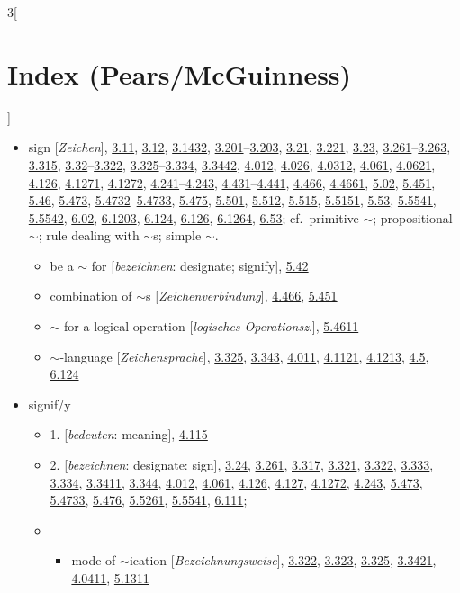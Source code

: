 \documentclass[oneside,openany,12pt]{book}
\newcommand{\indexentry}[1]{\item #1}
\newcommand{\indexsubentry}[1]{\begin{itemize} \item #1 \end{itemize}}
\newcommand{\indexsubsubentry}[1]{\begin{itemize} \item \begin{itemize} \item #1 \end{itemize} \end{itemize}}
\newcommand{\indexref}[1]{\hyperlink{prop#1}{#1}}
\begin{document}
\begin{multicols}{3}[\section*{Index (Pears/McGuinness)}]
\begin{itemize}
\indexentry{sign [\textit{Zeichen}], \indexref{3.11}, \indexref{3.12}, \indexref{3.1432}, \indexref{3.201}--\indexref{3.203}, \indexref{3.21}, \indexref{3.221}, \indexref{3.23}, \indexref{3.261}--\indexref{3.263}, \indexref{3.315}, \indexref{3.32}--\indexref{3.322}, \indexref{3.325}--\indexref{3.334}, \indexref{3.3442}, \indexref{4.012}, \indexref{4.026}, \indexref{4.0312}, \indexref{4.061}, \indexref{4.0621}, \indexref{4.126}, \indexref{4.1271}, \indexref{4.1272}, \indexref{4.241}--\indexref{4.243}, \indexref{4.431}--\indexref{4.441}, \indexref{4.466}, \indexref{4.4661}, \indexref{5.02}, \indexref{5.451}, \indexref{5.46}, \indexref{5.473}, \indexref{5.4732}--\indexref{5.4733}, \indexref{5.475}, \indexref{5.501}, \indexref{5.512}, \indexref{5.515}, \indexref{5.5151}, \indexref{5.53}, \indexref{5.5541}, \indexref{5.5542}, \indexref{6.02}, \indexref{6.1203}, \indexref{6.124}, \indexref{6.126}, \indexref{6.1264}, \indexref{6.53}; cf.\ primitive $\sim$; propositional $\sim$; rule dealing with $\sim$s; simple $\sim$.}

   \indexsubentry{be a $\sim$ for [\textit{bezeichnen}: designate; signify], \indexref{5.42}}

   \indexsubentry{combination of $\sim$s [\textit{Zeichenverbindung}], \indexref{4.466}, \indexref{5.451}}

   \indexsubentry{$\sim$ for a logical operation [\textit{logisches Operationsz}.], \indexref{5.4611}}

   \indexsubentry{$\sim$-language [\textit{Zeichensprache}], \indexref{3.325}, \indexref{3.343}, \indexref{4.011}, \indexref{4.1121}, \indexref{4.1213}, \indexref{4.5}, \indexref{6.124}}

\indexentry{signif/y}

   \indexsubentry{1. [\textit{bedeuten}: meaning], \indexref{4.115}}

   \indexsubentry{2. [\textit{bezeichnen}: designate: sign], \indexref{3.24}, \indexref{3.261}, \indexref{3.317}, \indexref{3.321}, \indexref{3.322}, \indexref{3.333}, \indexref{3.334}, \indexref{3.3411}, \indexref{3.344}, \indexref{4.012}, \indexref{4.061}, \indexref{4.126}, \indexref{4.127}, \indexref{4.1272}, \indexref{4.243}, \indexref{5.473}, \indexref{5.4733}, \indexref{5.476}, \indexref{5.5261}, \indexref{5.5541}, \indexref{6.111};}

   \indexsubsubentry{mode of $\sim$ication [\textit{Bezeichnungsweise}], \indexref{3.322}, \indexref{3.323}, \indexref{3.325}, \indexref{3.3421}, \indexref{4.0411}, \indexref{5.1311}}


\end{itemize}
\end{multicols}
\end{document}
